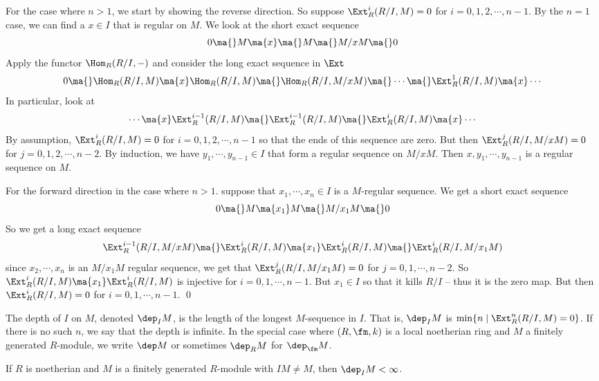 For the case where $n>1$, we start by showing the reverse direction. So suppose $\Ext^i_R(R/I,M)=0$ for $i=0,1,2,\cdots,n-1$. By the $n=1$ case, we can find a $x \in I$ that is regular on $M$. We look at the short exact sequence
\[
0 \ma{} M \ma{x} \ma{} M \ma{} M/xM \ma{} 0
\]
Apply the functor $\Hom_R(R/I,-)$ and consider the long exact sequence in $\Ext$
\[
0 \ma{} \Hom_R(R/I,M) \ma{x} \Hom_R(R/I,M) \ma{} \Hom_R(R/I,M/xM) \ma{} \cdots\ma{} \Ext_R^1(R/I,M) \ma{x} \cdots
\]
In particular, look at
\[
\cdots \ma{x} \Ext_R^{i-1}(R/I,M) \ma{} \Ext_R^{i-1}(R/I,M) \ma{} \Ext^i_R(R/I,M) \ma{x} \cdots 
\]
By assumption, $\Ext_R^i(R/I,M)=0$ for $i=0,1,2,\cdots,n-1$ so that the ends of this sequence are zero. But then $\Ext_R^j(R/I,M/xM)=0$ for $j=0,1,2,\cdots,n-2$. By induction, we have $y_1,\cdots,y_{n-1} \in I$ that form a regular sequence on $M/xM$. Then $x,y_1,\cdots,y_{n-1}$ is a regular sequence on $M$. 

For the forward direction in the case where $n>1$. suppose that $x_1,\cdots,x_n \in I$ is a $M$-regular sequence. We get a short exact sequence
\[
0 \ma{} M \ma{x_1} M \ma{} M/x_1M \ma{} 0
\]
So we get a long exact sequence
\[
\Ext_R^{i-1}(R/I,M/xM) \ma{} \Ext_R^i(R/I,M) \ma{x_1} \Ext_R^i(R/I,M) \ma{} \Ext_R^i(R/I,M/x_1M)
\]
since $x_2,\cdots,x_n$ is an $M/x_1M$ regular sequence, we get that $\Ext_R^j(R/I,M/x_1M)=0$ for $j=0,1,\cdots,n-2$. So $\Ext_R^i(R/I,M) \ma{x_1} \Ext_R^i(R/I,M)$ is injective for $i=0,1,\cdots,n-1$. But $x_1 \in I$ so that it kills $R/I$ -- thus it is the zero map. But then $\Ext_R^i(R/I,M)=0$ for $i=0,1,\cdots,n-1$. \qed \\








\begin{dfn}[Depth]
The depth of $I$ on $M$, denoted $\dep_I M$, is the length of the longest $M$-sequence in $I$. That is, $\dep_I M$ is $\min\{n\;|\;  \Ext_R^n(R/I,M)=0\}$. If there is no such $n$, we say that the depth is infinite. In the special case where $(R,\fm,k)$ is a local noetherian ring and $M$ a finitely generated $R$-module, we write $\dep M$ or sometimes $\dep_R M$ for $\dep_{\fm} M$. 
\end{dfn}

\begin{prop}
If $R$ is noetherian and $M$ is a finitely generated $R$-module with $IM \neq M$, then $\dep_I M<\infty$.
\end{prop}

